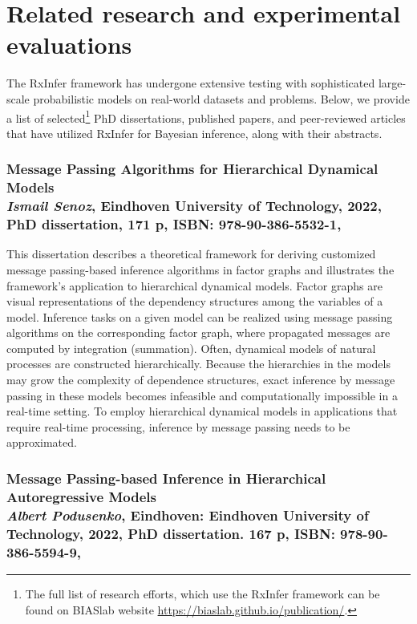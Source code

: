\section{Related research and experimental evaluations}\label{chapter-05:section:others}


The RxInfer framework has undergone extensive testing with sophisticated large-scale
probabilistic models on real-world datasets and problems.
Below, we provide a list of selected\footnote{The full list of research efforts, which use the RxInfer framework can be found on BIASlab website \url{https://biaslab.github.io/publication/}.} PhD dissertations, published papers, and peer-reviewed
articles that have utilized RxInfer for Bayesian inference, along with their abstracts.

\subsubsection*{Message Passing Algorithms for Hierarchical Dynamical Models\\{\small \normalfont \textit{Ismail Senoz}, Eindhoven University of Technology, 2022, PhD dissertation, 171 p, ISBN: 978-90-386-5532-1, \citep{senoz_thesis}}}

This dissertation describes a theoretical framework for deriving customized message
passing-based inference algorithms in factor graphs and illustrates the framework’s
application to hierarchical dynamical models.
Factor graphs are visual representations of the dependency structures among the variables of a
model.
Inference tasks on a given model can be realized using message passing algorithms on the
corresponding factor graph, where propagated messages are computed by integration (summation).
Often, dynamical models of natural processes are constructed hierarchically.
Because the hierarchies in the models may grow the complexity of dependence structures, exact
inference by message passing in these models becomes infeasible and computationally impossible
in a real-time setting.
To employ hierarchical dynamical models in applications that require real-time processing,
inference by message passing needs to be approximated.

\subsubsection*{Message Passing-based Inference in Hierarchical Autoregressive Models\\{\small \normalfont \textit{Albert Podusenko}, Eindhoven: Eindhoven University of Technology, 2022, PhD dissertation. 167 p, ISBN: 978-90-386-5594-9, \citep{podusenko_thesis}}}

